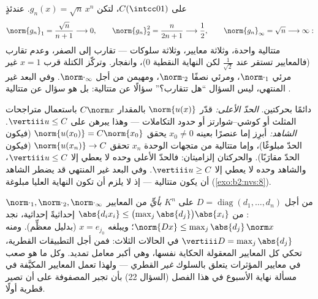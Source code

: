 \begin{example}\label{ex:b2:nvs:sqrtnxn}
على $C(\intcc01)$، لتكن $g_n(x) = \sqrt{n}\,x^n$. عندئذٍ
\[
\norm{g_n}_1 = \frac{\sqrt n}{n + 1} \longrightarrow 0,
\qquad
\norm{g_n}_2^2 = \frac{n}{2n + 1} \longrightarrow \frac12,
\qquad
\norm{g_n}_\infty = \sqrt n \longrightarrow \infty :
\]
متتالية واحدة، وثلاثة معايير، وثلاثة سلوكات --- تقارب إلى
الصفر، وعدم تقارب (فالمعايير تستقر عند $\frac1{\sqrt2}$ لكن
النهاية النقطية $0$)، وانفجار. وتركّز الكتلة
قرب $x = 1$ غير مرئي  $\norm\cdot_1$، ومرئي نصفًا 
$\norm\cdot_2$، ومهيمن من أجل $\norm\cdot_\infty$. وفي البعد
غير المنتهي، ليس السؤال ``هل تتقارب؟'' سؤالًا عن
متتالية: بل هو سؤال عن متتالية \emph{}.
\end{example}

\begin{method}\label{met:b2:nvs:opnorm}
دائمًا بحركتين. \emph{الحدّ الأعلى:} قدّر
$\norm{u(x)}$ بالمقدار $C\norm x$ باستعمال متراجحات المثلث
أو كوشي--شوارتز أو حدود التكاملات --- وهذا يبرهن على $\vertiii u
\leq C$. \emph{الشاهد:} أبرِز إما عنصرًا بعينه $x_0 \neq 0$
يحقق $\norm{u(x_0)} = C\norm{x_0}$ (فيكون الحدّ مبلوغًا)، وإما
متتالية من متجهات الوحدة $x_n$ تحقق $\norm{u(x_n)} \to C$ (فيكون
الحدّ مقارَبًا). والحركتان إلزاميتان: فالحدّ الأعلى
وحده لا يعطي إلا $\vertiii u \leq C$، والشاهد وحده لا يعطي إلا
$\vertiii u \geq C$. وفي البعد غير المنتهي قد يضطر الشاهد
أن يكون متتالية --- إذ لا يلزم أن تكون النهاية العليا مبلوغة
(\cref{exo:b2:nvs:8}).
\end{method}

\begin{example}\label{ex:b2:nvs:diagonalnorm}
من أجل $D = \operatorname{diag}(d_1, \dots, d_n)$ على $K^n$ \emph{بأيٍّ} من
المعايير $\norm\cdot_1, \norm\cdot_2,
\norm\cdot_\infty$: من $\abs{d_ix_i} \leq
\bigl(\max_j\abs{d_j}\bigr)\abs{x_i}$ إحداثيةً إحداثية، نجد
$\norm{Dx} \leq \max_j\abs{d_j}\,\norm x$؛ ويبلغه $x = e_{j_0}$
(بدليل معظِّم). ومنه $\vertiii D =
\max_j\abs{d_j}$ في الحالات الثلاث: فمن أجل التطبيقات القطرية، تحكي كل
المعايير المعقولة الحكاية نفسها، وهي أكبر معامل تمديد.
وكل ما هو صعب في معايير المؤثرات يتعلق بالسلوك
\emph{غير} القطري --- ولهذا تعمل المعايير المكيَّفة في
مسألة نهاية الأسبوع في هذا الفصل (السؤال 22) بأن
تجبر المصفوفة على أن تصير قطرية أولًا.
\end{example}

